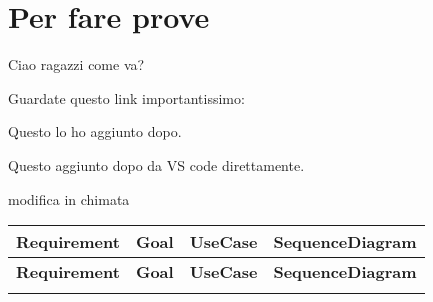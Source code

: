 \chapter{Per fare prove}

Ciao ragazzi come va?

Guardate questo link importantissimo: \citep{provaBibliografia}


Questo lo ho aggiunto dopo.

Questo aggiunto dopo da VS code direttamente.


modifica in chimata


\begin{longtable}{cccc} %
    \toprule
    \textbf{Requirement} & \textbf{Goal} & \textbf{UseCase} & \textbf{SequenceDiagram} \\
    \midrule
    \endfirsthead
    
    \toprule
    \textbf{Requirement} & \textbf{Goal} & \textbf{UseCase} & \textbf{SequenceDiagram} \\
    \midrule
    \endhead
    
    \bottomrule
    \endfoot
    

\end{longtable}
